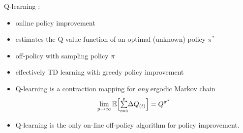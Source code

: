 \begin{frame}\frametitle{\subsecname}

Q-learning \citep{Watkins92}:
\begin{itemize}
\item online policy improvement
\item estimates the Q-value function of an optimal (unknown) policy $\pi^*$
\item off-policy with sampling policy $\pi$
\item effectively TD learning with greedy policy improvement
\item Q-learning is a contraction mapping for \emph{any} ergodic Markov chain
			\begin{equation}
				\lim\limits_{p \to \infty} \mathbb{E} \Big\lbrack
					{\textstyle \sum\limits_{\scriptscriptstyle t=0}^{\scriptscriptstyle p}} \Delta Q_{(t)} \Big\rbrack
				= Q^{\pi^*}
			\end{equation}
\item Q-learning is the only on-line off-policy algorithm for policy improvement.
\end{itemize}

\end{frame}
